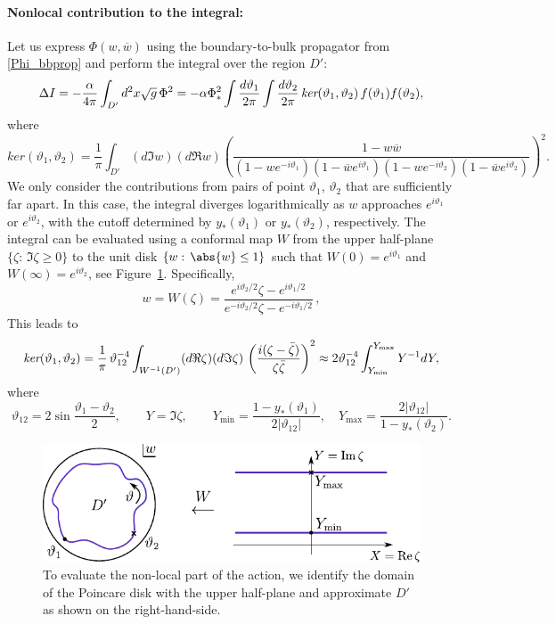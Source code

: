 \documentclass[12pt]{article}
\newcommand{\vt}{\vartheta}
\newcommand{\wc}{\overline{w}}
\newcommand{\ov}{\over}
\begin{document}
\paragraph{Nonlocal contribution to the integral:} Let us express $\Phi(w,\wc)$ using the boundary-to-bulk propagator from \eqref{Phi_bbprop} and perform the integral over the region $D'$:
\begin{equation}
\Delta I
=-\frac{\alpha}{4\pi}\int_{D'} d^2x \sqrt{g}\,\Phi^2
=-\alpha\Phi_*^2 \int{d\vt_1 \ov 2 \pi}\int{d\vt_2 \ov 2 \pi}\,
\textit{ker}(\vt_1,\vt_2)\,f(\vt_1)f(\vt_2),
\end{equation}
where
\begin{equation}\label{nlkernel}
\textit{ker}(\vt_1,\vt_2)=\frac{1}{\pi}\int_{D'} (d\Im w) (d\Re w) \left(
\frac{1-w\wc}{(1-w e^{-i\vt_1}) (1-\wc e^{i\vt_1})
(1-w e^{-i\vt_2}) (1-\wc e^{i\vt_2})}
\right)^2.
\end{equation}
We only consider the contributions from pairs of point $\vt_1$, $\vt_2$ that are sufficiently far apart. In this case, the integral diverges logarithmically as $w$ approaches $e^{i\vt_1}$ or $e^{i\vt_2}$, with the cutoff determined by $y_*(\vt_1)$ or $y_*(\vt_2)$, respectively. The integral can be evaluated using a conformal map $W$ from the upper half-plane $\{\zeta:\, \Im \zeta\geq 0\}$ to the unit disk $\{w:\, \abs{w} \leq 1\}$ such that $W(0)=e^{i\vt_1}$ and $W(\infty)=e^{i\vt_2}$, see Figure~\ref{fig: maptoplane}. Specifically,
\begin{equation}
w=W(\zeta)=\frac{e^{i\vt_2/2}\zeta-e^{i\vt_1/2}}
{e^{-i\vt_2/2}\zeta-e^{-i\vt_1/2}}\,,
\end{equation}
 This leads to
\begin{equation} \label{Keval}
\textit{ker}(\vt_1,\vt_2)= {1 \ov \pi}\,\vt_{12}^{-4}
\int_{W^{-1}(D')} (d\Re\zeta)(d\Im\zeta)\,
\left(\frac{i(\zeta-\bar{\zeta})}{\zeta\bar{\zeta}}\right)^2
\approx 2\vt_{12}^{-4}
\int_{Y_{\text{min}}}^{Y_{\text{max}}} Y^{-1}dY,
\end{equation}
where
\begin{equation}
\vt_{12}=2\sin\frac{\vt_1-\vt_2}{2},\qquad
Y=\Im\zeta,\qquad
Y_{\text{min}}=\frac{1-y_*(\vt_1)}{2|\vt_{12}|},\quad
Y_{\text{max}}=\frac{2|\vt_{12}|}{1-y_*(\vt_2)}.
\end{equation}
\begin{figure}[t]
\centerline{\includegraphics[scale=1.0]{maptoplane}}
\caption{To evaluate the non-local part of the action, we identify the domain of the Poincare disk with the upper half-plane and approximate $D'$ as shown on the right-hand-side.}
\label{fig: maptoplane}
\end{figure}
\end{document}
